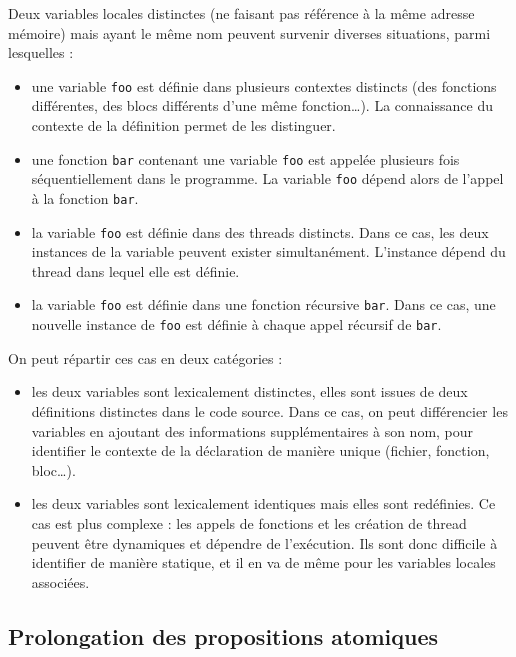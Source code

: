 Deux variables locales distinctes (ne faisant pas référence à la même
adresse mémoire) mais ayant le même nom peuvent survenir diverses situations,
parmi lesquelles :

\begin{itemize}
\item
  une variable \texttt{foo} est définie dans plusieurs contextes
  distincts (des fonctions différentes, des blocs différents d'une même
  fonction\ldots{}). La connaissance du contexte de la définition permet
  de les distinguer.
\item
  une fonction \texttt{bar} contenant une variable \texttt{foo}
  est appelée plusieurs fois séquentiellement dans le programme. La
  variable \texttt{foo} dépend alors de l'appel à la fonction
  \texttt{bar}.
\item
  la variable \texttt{foo} est définie dans des threads distincts.
  Dans ce cas, les deux instances de la variable peuvent exister
  simultanément. L'instance dépend du thread dans lequel elle est
  définie.
\item
  la variable \texttt{foo} est définie dans une fonction récursive
  \texttt{bar}. Dans ce cas, une nouvelle instance de \texttt{foo}
  est définie à chaque appel récursif de \texttt{bar}.
\end{itemize}

On peut répartir ces cas en deux catégories :

\begin{itemize}
\item
  les deux variables sont lexicalement distinctes, elles sont issues de
  deux définitions distinctes dans le code source. Dans ce cas, on peut
  différencier les variables en ajoutant des informations
  supplémentaires à son nom, pour identifier le contexte de la
  déclaration de manière unique (fichier, fonction, bloc\ldots{}).
\item
  les deux variables sont lexicalement identiques mais elles sont
  redéfinies. Ce cas est plus complexe : les appels de fonctions et les
  création de thread peuvent être dynamiques et dépendre de l'exécution.
  Ils sont donc difficile à identifier de manière statique, et il en va
  de même pour les variables locales associées.
\end{itemize}

\subsection{Prolongation des propositions atomiques}


